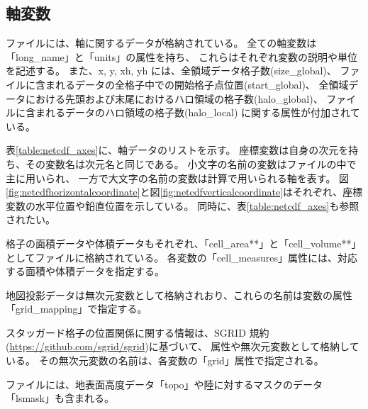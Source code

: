 \subsection{軸変数}
\scalenetcdf ファイルには、軸に関するデータが格納されている。
全ての軸変数は「long\_name」と「units」の属性を持ち、
これらはそれぞれ変数の説明や単位を記述する。
また、x, y, xh, yh には、全領域データ格子数(size\_global)、
ファイルに含まれるデータの全格子中での開始格子点位置(start\_global)、
全領域データにおける先頭および末尾におけるハロ領域の格子数(halo\_global)、
ファイルに含まれるデータのハロ領域の格子数(halo\_local) に関する属性が付加されている。

表\ref{table:netcdf_axes}に、軸データのリストを示す。
座標変数は自身の次元を持ち、その変数名は次元名と同じである。
小文字の名前の変数はファイルの中で主に用いられ、
一方で大文字の名前の変数は計算で用いられる軸を表す。
図\ref{fig:netcdfhorizontalcoordinate}と図\ref{fig:netcdfverticalcoordinate}はそれぞれ、座標変数の水平位置や鉛直位置を示している。
同時に、表\ref{table:netcdf_axes}も参照されたい。

格子の面積データや体積データもそれぞれ、「cell\_area**」と「cell\_volume**」としてファイルに格納されている。
各変数の「cell\_measures」属性には、対応する面積や体積データを指定する。

地図投影データは無次元変数として格納されおり、これらの名前は変数の属性「grid\_mapping」で指定する。

スタッガード格子の位置関係に関する情報は、SGRID 規約(\url{https://github.com/sgrid/sgrid})に基づいて、
属性や無次元変数として格納している。
その無次元変数の名前は、各変数の「grid」属性で指定される。

ファイルには、地表面高度データ「topo」や陸に対するマスクのデータ「lsmask」も含まれる。


